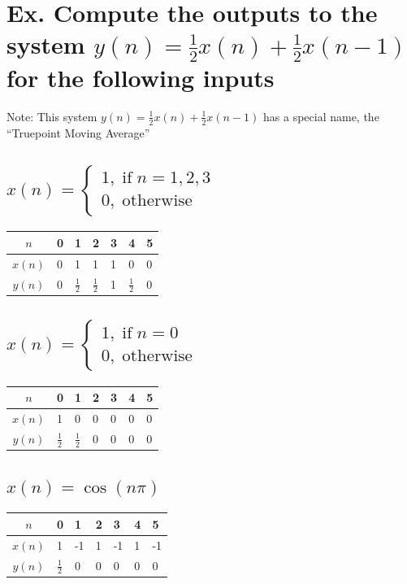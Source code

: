 \documentclass{article}
\renewcommand{\thesubsection}{\thesection.\alph{subsection}}
\begin{document}
\section[Example ~\thesection]{Ex. Compute the outputs to the system $y(n) = \frac{1}{2}x(n) + \frac{1}{2}x(n-1)$ for the following inputs}

Note: This system $y(n) = \frac{1}{2}x(n) + \frac{1}{2}x(n-1)$ has a special name, the ``Truepoint Moving Average''

\subsection[~\thesubsection]{$x(n) = \begin{cases} 1, \; \text{if} \; n = 1, 2, 3 \\ 0, \; \text{otherwise} \end{cases}$}

\begin{tabularx}{\linewidth}{| c || Y Y Y Y Y Y |}
	\hline
	$n$ & 0 & 1 & 2 & 3 & 4 & 5\\
	\hline
	$x(n)$ & 0 & 1 & 1 & 1 & 0 & 0\\
	$y(n)$ & 0 & $\tfrac{1}{2}$ & $\tfrac{1}{2}$ & 1 & $\tfrac{1}{2}$ & 0\\
	\hline
\end{tabularx}

\subsection[~\thesubsection]{$x(n) = \begin{cases} 1, \; \text{if} \; n = 0 \\ 0, \; \text{otherwise} \end{cases}$}

\begin{tabularx}{\linewidth}{| c || Y Y Y Y Y Y |}
	\hline
	$n$ & 0 & 1 & 2 & 3 & 4 & 5\\
	\hline
	$x(n)$ & 1 & 0 & 0 & 0 & 0 & 0\\
	$y(n)$ & $\tfrac{1}{2}$ & $\tfrac{1}{2}$ & 0 & 0 & 0 & 0\\
	\hline
\end{tabularx}

\subsection[~\thesubsection]{$x(n) = \cos(n\pi)$}

\begin{tabularx}{\linewidth}{| c || Y Y Y Y Y Y |}
	\hline
	$n$ & 0 & 1 & 2 & 3 & 4 & 5\\
	\hline
	$x(n)$ & 1 & -1 & 1 & -1 & 1 & -1\\
	$y(n)$ & $\tfrac{1}{2}$ & 0 & 0 & 0 & 0 & 0\\
	\hline
\end{tabularx}
\end{document}

